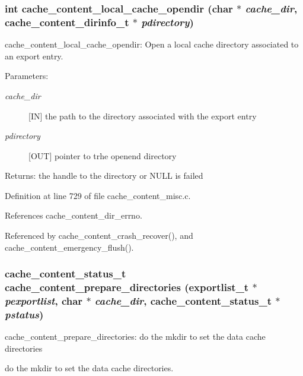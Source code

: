 \subsubsection{\setlength{\rightskip}{0pt plus 5cm}int cache\_\-content\_\-local\_\-cache\_\-opendir (char $\ast$ {\em cache\_\-dir}, cache\_\-content\_\-dirinfo\_\-t $\ast$ {\em pdirectory})}\label{cache__content__misc_8c_a16}


cache\_\-content\_\-local\_\-cache\_\-opendir: Open a local cache directory associated to an export entry.

\begin{Desc}
\item[Parameters:]
\begin{description}
\item[{\em cache\_\-dir}][IN] the path to the directory associated with the export entry \item[{\em pdirectory}][OUT] pointer to trhe openend directory\end{description}
\end{Desc}
\begin{Desc}
\item[Returns:]the handle to the directory or NULL is failed \end{Desc}


Definition at line 729 of file cache\_\-content\_\-misc.c.

References cache\_\-content\_\-dir\_\-errno.

Referenced by cache\_\-content\_\-crash\_\-recover(), and cache\_\-content\_\-emergency\_\-flush().
\subsubsection{\setlength{\rightskip}{0pt plus 5cm}cache\_\-content\_\-status\_\-t cache\_\-content\_\-prepare\_\-directories (exportlist\_\-t $\ast$ {\em pexportlist}, char $\ast$ {\em cache\_\-dir}, cache\_\-content\_\-status\_\-t $\ast$ {\em pstatus})}\label{cache__content__misc_8c_a13}


cache\_\-content\_\-prepare\_\-directories: do the mkdir to set the data cache directories

do the mkdir to set the data cache directories.

